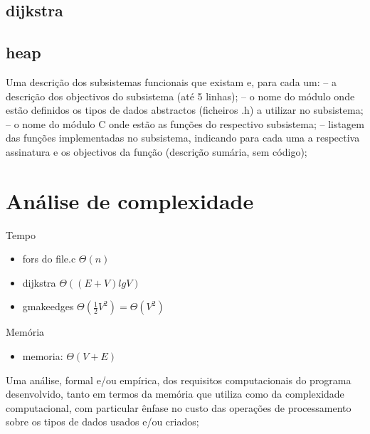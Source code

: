 \documentclass[a4paper, 18pt]{article}
\newcommand\tu[0]{\textunderscore}
\begin{document}
	\subsection{dijkstra}
	\subsection{heap}

	\par
	Uma descrição dos subsistemas funcionais que existam e, para cada um:
	– a descrição dos objectivos do subsistema (até 5 linhas);
	– o nome do módulo onde estão definidos os tipos de dados abstractos
	  (ficheiros .h) a utilizar no subsistema;
	– o nome do módulo C onde estão as funções do respectivo subsistema;
	– listagem das funções implementadas no subsistema, indicando para cada uma a
	  respectiva assinatura e os objectivos da função (descrição sumária, sem código);


\section{Análise de complexidade}
	\par
	Tempo
	\begin{itemize}
		\item fors do file.c $\Theta(n)$
		\item dijkstra $\Theta((E+V) lg V)$
		\item g\tu make\tu edges $\Theta(\frac{1}{2}V^2) = \Theta(V^2)$
	\end{itemize}
	\par
	Memória
	\begin{itemize}
		\item memoria: $\Theta(V + E)$
	\end{itemize}
	\par
	Uma análise, formal e/ou empírica, dos requisitos computacionais do programa desenvolvido, tanto em termos da memória que utiliza como da complexidade computacional, com particular ênfase no custo das operações de processamento sobre os tipos de dados usados e/ou criados;
\end{document}

